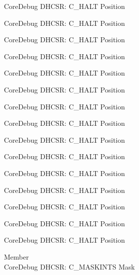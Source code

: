 \begin{DoxyRefList}
\label{deprecated__deprecated000125}%
%
Core\+Debug DHCSR\+: C\+\_\+\+HALT Position 

\label{deprecated__deprecated000181}%
%
Core\+Debug DHCSR\+: C\+\_\+\+HALT Position 

\label{deprecated__deprecated000264}%
%
Core\+Debug DHCSR\+: C\+\_\+\+HALT Position 

\label{deprecated__deprecated000323}%
%
Core\+Debug DHCSR\+: C\+\_\+\+HALT Position 

\label{deprecated__deprecated000399}%
%
Core\+Debug DHCSR\+: C\+\_\+\+HALT Position 

\label{deprecated__deprecated000488}%
%
Core\+Debug DHCSR\+: C\+\_\+\+HALT Position 

\label{deprecated__deprecated000590}%
%
Core\+Debug DHCSR\+: C\+\_\+\+HALT Position 

\label{deprecated__deprecated000696}%
%
Core\+Debug DHCSR\+: C\+\_\+\+HALT Position 

\label{deprecated__deprecated000784}%
%
Core\+Debug DHCSR\+: C\+\_\+\+HALT Position 

\label{deprecated__deprecated000840}%
%
Core\+Debug DHCSR\+: C\+\_\+\+HALT Position 

\label{deprecated__deprecated000923}%
%
Core\+Debug DHCSR\+: C\+\_\+\+HALT Position 

\label{deprecated__deprecated000982}%
%
Core\+Debug DHCSR\+: C\+\_\+\+HALT Position 

\label{deprecated__deprecated001058}%
%
Core\+Debug DHCSR\+: C\+\_\+\+HALT Position 

\label{deprecated__deprecated001147}%
%
Core\+Debug DHCSR\+: C\+\_\+\+HALT Position 

\label{deprecated__deprecated001249}%
%
Core\+Debug DHCSR\+: C\+\_\+\+HALT Position  
\item[Member \doxylink{group___c_m_s_i_s___core_debug_ga77fe1ef3c4a729c1c82fb62a94a51c31}{Core\+Debug\+\_\+\+DHCSR\+\_\+\+C\+\_\+\+MASKINTS\+\_\+\+Msk} ]\hfill \\
\label{deprecated__deprecated000034}%
%
Core\+Debug DHCSR\+: C\+\_\+\+MASKINTS Mask 


\end{DoxyRefList}
